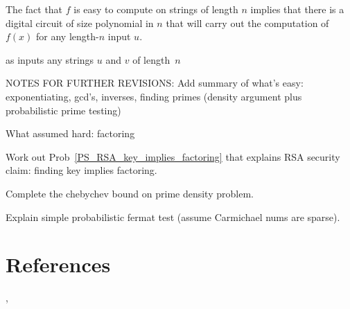 The fact that $f$ is easy to compute on strings of length $n$ implies
that there is a digital circuit of size polynomial in $n$ that will
carry out the computation of $f(x)$ for any length-$n$ input $u$.

as inputs any strings $u$ and $v$ of length~$n$ \fi

\begin{editingnotes}
NOTES FOR FURTHER REVISIONS:
Add summary of what's easy: exponentiating, gcd's, inverses, finding
primes (density argument plus probabilistic prime testing)

What assumed hard: factoring

Work out Prob~\ref{PS_RSA_key_implies_factoring} that explains RSA security claim: finding
key implies factoring.

Complete the chebychev bound on prime density problem.

Explain simple probabilistic fermat test (assume Carmichael nums are sparse).
\end{editingnotes}


\section{References}

 \cite{BachS1996},
 \cite{Shoup2005}

\endinput

